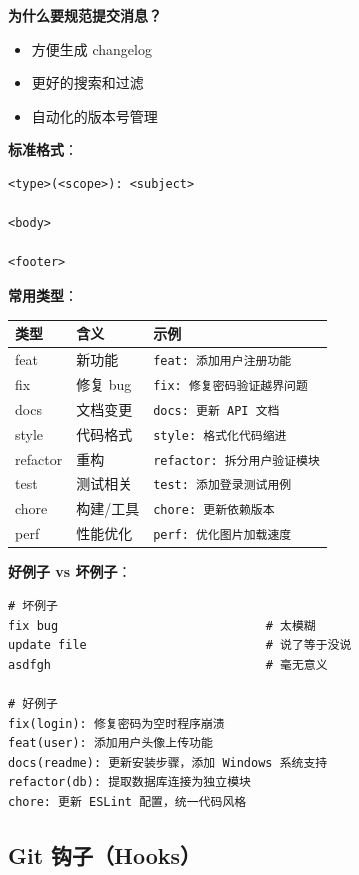 \documentclass[12pt,a4paper]{article}
\begin{document}
\textbf{为什么要规范提交消息？}
\begin{itemize}[itemsep=3pt]
    \item 方便生成 changelog
    \item 更好的搜索和过滤
    \item 自动化的版本号管理
\end{itemize}

\textbf{标准格式}：

\begin{lstlisting}
<type>(<scope>): <subject>

<body>

<footer>
\end{lstlisting}

\textbf{常用类型}：
\begin{longtable}{|p{3cm}|p{4cm}|p{5cm}|}
\hline
\textbf{类型} & \textbf{含义} & \textbf{示例} \\
\hline
feat & 新功能 & \texttt{feat: 添加用户注册功能} \\
\hline
fix & 修复 bug & \texttt{fix: 修复密码验证越界问题} \\
\hline
docs & 文档变更 & \texttt{docs: 更新 API 文档} \\
\hline
style & 代码格式 & \texttt{style: 格式化代码缩进} \\
\hline
refactor & 重构 & \texttt{refactor: 拆分用户验证模块} \\
\hline
test & 测试相关 & \texttt{test: 添加登录测试用例} \\
\hline
chore & 构建/工具 & \texttt{chore: 更新依赖版本} \\
\hline
perf & 性能优化 & \texttt{perf: 优化图片加载速度} \\
\hline
\end{longtable}

\textbf{好例子 vs 坏例子}：

\begin{lstlisting}[numbers=none]
# 坏例子
fix bug                             # 太模糊
update file                         # 说了等于没说
asdfgh                              # 毫无意义

# 好例子
fix(login): 修复密码为空时程序崩溃
feat(user): 添加用户头像上传功能
docs(readme): 更新安装步骤，添加 Windows 系统支持
refactor(db): 提取数据库连接为独立模块
chore: 更新 ESLint 配置，统一代码风格
\end{lstlisting}

\subsection{Git 钩子（Hooks）}
\end{document}
